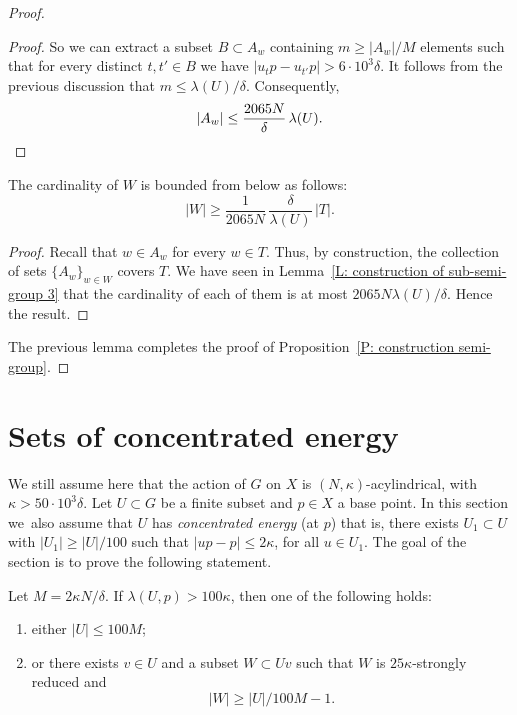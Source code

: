\begin{proof}
\begin{proof}
So we can extract a subset $B \subset A_w$ containing $m \geq |A_w| / M$ elements such that for every distinct $t,t' \in B$ we have $|u_tp - u_{t'}p| > 6\cdot 10^3\delta$.
It follows from the previous discussion that $m \leq \lambda(U) / \delta$.
Consequently,
\begin{equation*}
|A_w| \leq \frac{2065N}{\delta}\, \lambda(U). \qedhere
\end{equation*}
\end{proof}

\begin{lem}\label{L: construction of sub-semi-group 6}
The cardinality of $W$ is bounded from below as follows:
\[
|W|\geqslant \frac 1{2065N}\,\frac \delta{\lambda(U)}\, |T|.
\]
\end{lem}

\begin{proof}
Recall that $w \in A_w$ for every $w \in T$.
Thus, by construction, the collection of sets $\{A_w\}_{w \in W}$ covers $T$.
We have seen in Lemma~\ref{L: construction of sub-semi-group 3} that the cardinality of each of them is at most $2065N\lambda(U)/\delta$.
Hence the result.
\end{proof}

The previous lemma completes the proof of Proposition~\ref{P: construction semi-group}.
\end{proof}

\section{Sets of concentrated energy}
We still assume here that the action of $G$ on $X$ is $(N, \kappa)$-acylindrical, with $\kappa > 50\cdot 10^3\delta$.
Let $U\subset G$ be a finite subset and $p \in X$ a base point.
In this section we~also assume that $U$ has \emph{concentrated energy} (at $p$) that is, there exists $U_1 \subset U$ with $|U_1| \geq |U|/100$ such that $|up-p|\leqslant 2\kappa$, for all $u\in U_1$.
The goal of the section is to prove the following statement.

\begin{prop}\label{P: main concentrated}
Let $M =2\kappa N/ \delta$.
If $\lambda(U,p)> 100\kappa$, then one of the following holds:
\begin{enumerate}
\item either $ |U| \leq 100M$;
\item or there exists $v \in U$ and a subset $W \subset Uv$ such that $W$ is $25\kappa$-strongly reduced and
\[
|W| \geq |U|/100M - 1.
\]
\end{enumerate}
\end{prop}

